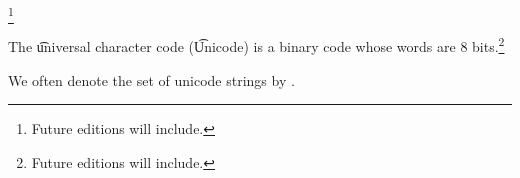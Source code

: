 
\footnote{Future editions will include.}


The \t{universal character code} (\t{Unicode}) is a binary code whose words are 8 bits.\footnote{Future editions will include.}


We often denote the set of unicode strings by \ustring.

\blankpage
